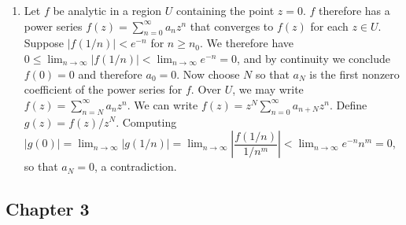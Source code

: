 \documentclass[11pt]{book}
\theoremstyle{definition}
\begin{document}
\begin{enumerate}
%
%
\item Let $f$ be analytic in a region $U$ containing the point $z=0$. $f$ therefore has a power series $f(z)=\sum_{n=0}^\infty a_nz^n$ that converges to $f(z)$ for each $z\in U$. Suppose $|f(1/n)|<e^{-n}$ for $n\geq n_0$. We therefore have $0\leq \lim_{n\to\infty} |f(1/n)| < \lim_{n\to\infty} e^{-n} = 0$, and by continuity we conclude $f(0)=0$ and therefore $a_0=0$. Now choose $N$ so that $a_N$ is the first nonzero coefficient of the power series for $f$. Over $U$, we may write $f(z)=\sum_{n=N}^\infty a_nz^n$. We can write $f(z)=z^N\sum_{n=0}^\infty a_{n+N}z^n$. Define $g(z)=f(z)/z^N$. Computing $|g(0)|=\lim_{n\to\infty}|g(1/n)|=\lim_{n\to\infty}\left|\dfrac{f(1/n)}{1/n^m}\right| < \lim_{n\to\infty}e^{-n}n^m = 0$, so that $a_N=0$, a contradiction.
\end{enumerate}
\subsection{Chapter 3}
\end{document}
